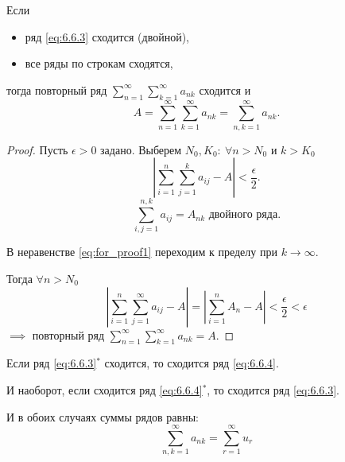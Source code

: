 \begin{theorem}
    Если
    \begin{itemize}
        \item ряд \ref{eq:6.6.3} сходится (двойной),
        \item все ряды по строкам сходятся,
    \end{itemize}
    тогда повторный ряд $ \sum_{n=1}^{\infty}\sum_{k=1}^{\infty}a_{nk} $ сходится и
    \[
        A = \sum_{n=1}^{\infty}\sum_{k=1}^{\infty}a_{nk} = \sum_{n,k=1}^{\infty}a_{nk}.
    \]
\end{theorem}

\begin{proof}
    Пусть $ \epsilon>0 $ задано. Выберем $ N_0,K_0: \ \forall n > N_0 $ и $ k>K_0 $
    \begin{equation}\label{eq:for_proof1}
        \left|\sum_{i=1}^{n}\sum_{j=1}^{k}a_{ij} - A\right| < \frac{\epsilon}{2}.
    \end{equation}
    \[
        \sum_{i,j=1}^{n,k}a_{ij} = A_{nk}\text{ двойного ряда}.
    \]

    В неравенстве \ref{eq:for_proof1} переходим к пределу при $ k \rightarrow\infty $.

    Тогда $ \forall n > N_0 $
    \[
        \left|\sum_{i=1}^{n}\sum_{j=1}^{\infty}a_{ij} - A\right| = \left|\sum_{i=1}^{n}A_n - A\right| < \frac{\epsilon}{2} < \epsilon
    \]
    $ \implies $ повторный ряд $ \sum_{n=1}^{\infty}\sum_{k=1}^{\infty}a_{nk} = A $.
\end{proof}

\begin{theorem}
    Если ряд \ref{eq:6.6.3}$ ^* $ сходится, то сходится ряд \ref{eq:6.6.4}.

    И наоборот, если сходится ряд \ref{eq:6.6.4}$ ^* $, то сходится ряд \ref{eq:6.6.3}.

    И в обоих случаях суммы рядов равны:
    \[
        \sum_{n,k=1}^{\infty}a_{nk} = \sum_{r=1}^{\infty}u_r
    \]
\end{theorem}

